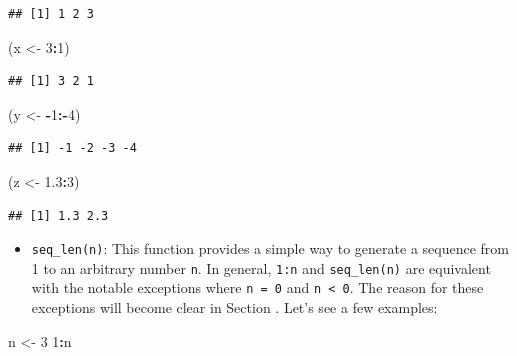 \documentclass[12pt,]{krantz}
\newenvironment{Shaded}{\begin{snugshade}}{\end{snugshade}}
\newcommand{\DecValTok}[1]{\textcolor[rgb]{0.06,0.06,0.06}{#1}}
\newcommand{\FloatTok}[1]{\textcolor[rgb]{0.06,0.06,0.06}{#1}}
\newcommand{\StringTok}[1]{\textcolor[rgb]{0.5,0.5,0.5}{#1}}
\newcommand{\OperatorTok}[1]{\textcolor[rgb]{0.43,0.43,0.43}{\textbf{#1}}}
\newcommand{\NormalTok}[1]{#1}
\providecommand{\tightlist}{%
  \setlength{\itemsep}{0pt}\setlength{\parskip}{0pt}}
\begin{document}
\begin{verbatim}
## [1] 1 2 3
\end{verbatim}

\begin{Shaded}
\begin{Highlighting}[]
\NormalTok{(x <-}\StringTok{ }\DecValTok{3}\OperatorTok{:}\DecValTok{1}\NormalTok{)}
\end{Highlighting}
\end{Shaded}

\begin{verbatim}
## [1] 3 2 1
\end{verbatim}

\begin{Shaded}
\begin{Highlighting}[]
\NormalTok{(y <-}\StringTok{ }\OperatorTok{-}\DecValTok{1}\OperatorTok{:-}\DecValTok{4}\NormalTok{)}
\end{Highlighting}
\end{Shaded}

\begin{verbatim}
## [1] -1 -2 -3 -4
\end{verbatim}

\begin{Shaded}
\begin{Highlighting}[]
\NormalTok{(z <-}\StringTok{ }\FloatTok{1.3}\OperatorTok{:}\DecValTok{3}\NormalTok{)}
\end{Highlighting}
\end{Shaded}

\begin{verbatim}
## [1] 1.3 2.3
\end{verbatim}

\begin{itemize}
\tightlist
\item
  \texttt{seq\_len(n)}: This function provides a simple way to generate
  a sequence from 1 to an arbitrary number \texttt{n}. In general,
  \texttt{1:n} and \texttt{seq\_len(n)} are equivalent with the notable
  exceptions where \texttt{n\ =\ 0} and \texttt{n\ \textless{}\ 0}. The
  reason for these exceptions will become clear in Section
  . Let's see a few examples:
\end{itemize}

\begin{Shaded}
\begin{Highlighting}[]
\NormalTok{n <-}\StringTok{ }\DecValTok{3}
\DecValTok{1}\OperatorTok{:}\NormalTok{n}
\end{Highlighting}
\end{Shaded}
\end{document}

